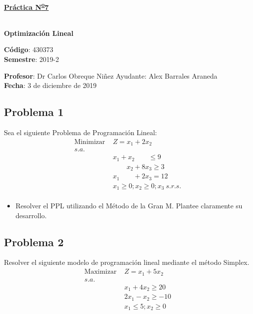 \documentclass[letterpaper]{article}
\begin{document}
\vspace*{0.5\baselineskip}
\begin{center}
\begin{Large}
\textbf{\underline{Práctica N\textsuperscript{\underline{o}}7}}
\end{Large}\\
\vspace*{0.5\baselineskip}
\textbf{Optimización Lineal} \\
\vspace*{0.5\baselineskip}
\begin{footnotesize}
\textbf{Código}: 430373\\
\textbf{Semestre}: 2019-2
\end{footnotesize}
\end{center}

\noindent \textbf{Profesor}: Dr Carlos Obreque Niñez  \hfill Ayudante: Alex Barrales Araneda\\
\noindent \textbf{Fecha}: 3 de diciembre de 2019

\subsection*{Problema 1}
Sea el siguiente Problema de Programación Lineal:
\begin{align*}
\mbox{Minimizar }&Z = x_1 + 2x_2 \\
s.a.\\
&x_1 + x_2 \qquad \leq 9\\
&\qquad x_2 + 8x_3 \geq 3\\
&x_1 \qquad + 2x_3  = 12\\
&x_1 \geq 0 ;x_2 \geq 0 ;x_3\: s.r.s.\\
\end{align*}

\begin{itemize}
\item Resolver el PPL utilizando el Método de la Gran M. Plantee claramente su desarrollo. 
\end{itemize}

\subsection*{Problema 2}
Resolver el siguiente modelo de programación lineal mediante el método Simplex.
\begin{align*}
\mbox{Maximizar }&Z = x_1 + 5x_2\\
s.a.\\
&x_1 + 4x_2 \geq 20\\
&2x_1 - x_2 \geq -10\\
&x_1 \leq 5 ; x_2 \geq 0\\
\end{align*}
\end{document}
